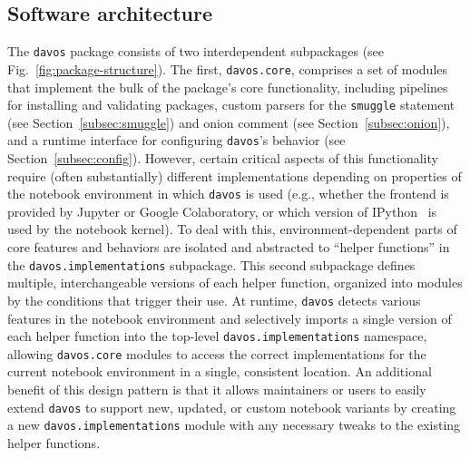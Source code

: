 \documentclass[preprint,12pt,a4paper]{elsarticle}
\newcommand{\comment}[1]{}
\begin{document}
\subsection{Software architecture}
The \texttt{davos} package consists of two interdependent subpackages (see Fig.~\ref{fig:package-structure}). The first, \texttt{davos.core}, comprises a set of modules that implement\comment{provide?} the bulk of the package's core functionality, including pipelines for installing and validating packages, custom parsers for the \texttt{smuggle} statement (see Section~\ref{subsec:smuggle}) and onion comment (see Section~\ref{subsec:onion}), and a runtime interface for configuring \texttt{davos}'s behavior (see Section~\ref{subsec:config}). However, certain critical\comment{other important} aspects of this functionality require (often substantially) different implementations depending on properties of the notebook environment in which \texttt{davos} is used (e.g., whether the frontend is provided by Jupyter or Google Colaboratory, or which version of IPython~\cite{PereGran07} is used by the notebook kernel). To deal with this, environment-dependent parts of core features and behaviors are isolated and abstracted to ``helper functions'' in the \texttt{davos.implementations} subpackage. This second subpackage defines multiple, interchangeable versions of each helper function, organized into modules by the conditions that trigger their use. At runtime, \texttt{davos} detects various features in the notebook environment and selectively imports a single version of each helper function into the top-level \texttt{davos.implementations} namespace, allowing \texttt{davos.core} modules to access the correct implementations for the current notebook environment in a single, consistent location. An additional benefit of this design pattern is that it allows maintainers or users to easily extend \texttt{davos} to support new, updated, or custom notebook variants by creating a new \texttt{davos.implementations} module with any necessary tweaks to the existing helper functions.


\comment{
- js_functions.py?
- how parser is registered and deregistered?
- stub files?
- test suite?
- packaged with new PEP \_\_\_ standard (pyproject.toml + setup.cfg; no setup.py)?
}
\end{document}
